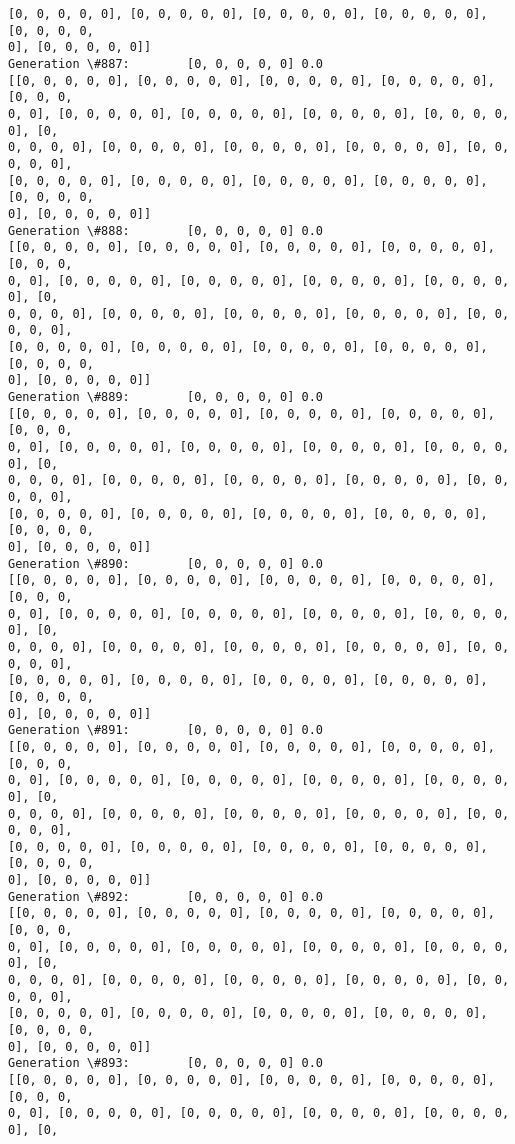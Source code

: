 \documentclass[11pt]{article}
\begin{document}
\begin{Verbatim}[commandchars=\\\{\}]
[0, 0, 0, 0, 0], [0, 0, 0, 0, 0], [0, 0, 0, 0, 0], [0, 0, 0, 0, 0], [0, 0, 0, 0,
0], [0, 0, 0, 0, 0]]
Generation \#887:        [0, 0, 0, 0, 0] 0.0
[[0, 0, 0, 0, 0], [0, 0, 0, 0, 0], [0, 0, 0, 0, 0], [0, 0, 0, 0, 0], [0, 0, 0,
0, 0], [0, 0, 0, 0, 0], [0, 0, 0, 0, 0], [0, 0, 0, 0, 0], [0, 0, 0, 0, 0], [0,
0, 0, 0, 0], [0, 0, 0, 0, 0], [0, 0, 0, 0, 0], [0, 0, 0, 0, 0], [0, 0, 0, 0, 0],
[0, 0, 0, 0, 0], [0, 0, 0, 0, 0], [0, 0, 0, 0, 0], [0, 0, 0, 0, 0], [0, 0, 0, 0,
0], [0, 0, 0, 0, 0]]
Generation \#888:        [0, 0, 0, 0, 0] 0.0
[[0, 0, 0, 0, 0], [0, 0, 0, 0, 0], [0, 0, 0, 0, 0], [0, 0, 0, 0, 0], [0, 0, 0,
0, 0], [0, 0, 0, 0, 0], [0, 0, 0, 0, 0], [0, 0, 0, 0, 0], [0, 0, 0, 0, 0], [0,
0, 0, 0, 0], [0, 0, 0, 0, 0], [0, 0, 0, 0, 0], [0, 0, 0, 0, 0], [0, 0, 0, 0, 0],
[0, 0, 0, 0, 0], [0, 0, 0, 0, 0], [0, 0, 0, 0, 0], [0, 0, 0, 0, 0], [0, 0, 0, 0,
0], [0, 0, 0, 0, 0]]
Generation \#889:        [0, 0, 0, 0, 0] 0.0
[[0, 0, 0, 0, 0], [0, 0, 0, 0, 0], [0, 0, 0, 0, 0], [0, 0, 0, 0, 0], [0, 0, 0,
0, 0], [0, 0, 0, 0, 0], [0, 0, 0, 0, 0], [0, 0, 0, 0, 0], [0, 0, 0, 0, 0], [0,
0, 0, 0, 0], [0, 0, 0, 0, 0], [0, 0, 0, 0, 0], [0, 0, 0, 0, 0], [0, 0, 0, 0, 0],
[0, 0, 0, 0, 0], [0, 0, 0, 0, 0], [0, 0, 0, 0, 0], [0, 0, 0, 0, 0], [0, 0, 0, 0,
0], [0, 0, 0, 0, 0]]
Generation \#890:        [0, 0, 0, 0, 0] 0.0
[[0, 0, 0, 0, 0], [0, 0, 0, 0, 0], [0, 0, 0, 0, 0], [0, 0, 0, 0, 0], [0, 0, 0,
0, 0], [0, 0, 0, 0, 0], [0, 0, 0, 0, 0], [0, 0, 0, 0, 0], [0, 0, 0, 0, 0], [0,
0, 0, 0, 0], [0, 0, 0, 0, 0], [0, 0, 0, 0, 0], [0, 0, 0, 0, 0], [0, 0, 0, 0, 0],
[0, 0, 0, 0, 0], [0, 0, 0, 0, 0], [0, 0, 0, 0, 0], [0, 0, 0, 0, 0], [0, 0, 0, 0,
0], [0, 0, 0, 0, 0]]
Generation \#891:        [0, 0, 0, 0, 0] 0.0
[[0, 0, 0, 0, 0], [0, 0, 0, 0, 0], [0, 0, 0, 0, 0], [0, 0, 0, 0, 0], [0, 0, 0,
0, 0], [0, 0, 0, 0, 0], [0, 0, 0, 0, 0], [0, 0, 0, 0, 0], [0, 0, 0, 0, 0], [0,
0, 0, 0, 0], [0, 0, 0, 0, 0], [0, 0, 0, 0, 0], [0, 0, 0, 0, 0], [0, 0, 0, 0, 0],
[0, 0, 0, 0, 0], [0, 0, 0, 0, 0], [0, 0, 0, 0, 0], [0, 0, 0, 0, 0], [0, 0, 0, 0,
0], [0, 0, 0, 0, 0]]
Generation \#892:        [0, 0, 0, 0, 0] 0.0
[[0, 0, 0, 0, 0], [0, 0, 0, 0, 0], [0, 0, 0, 0, 0], [0, 0, 0, 0, 0], [0, 0, 0,
0, 0], [0, 0, 0, 0, 0], [0, 0, 0, 0, 0], [0, 0, 0, 0, 0], [0, 0, 0, 0, 0], [0,
0, 0, 0, 0], [0, 0, 0, 0, 0], [0, 0, 0, 0, 0], [0, 0, 0, 0, 0], [0, 0, 0, 0, 0],
[0, 0, 0, 0, 0], [0, 0, 0, 0, 0], [0, 0, 0, 0, 0], [0, 0, 0, 0, 0], [0, 0, 0, 0,
0], [0, 0, 0, 0, 0]]
Generation \#893:        [0, 0, 0, 0, 0] 0.0
[[0, 0, 0, 0, 0], [0, 0, 0, 0, 0], [0, 0, 0, 0, 0], [0, 0, 0, 0, 0], [0, 0, 0,
0, 0], [0, 0, 0, 0, 0], [0, 0, 0, 0, 0], [0, 0, 0, 0, 0], [0, 0, 0, 0, 0], [0,

\end{Verbatim}
\end{document}

